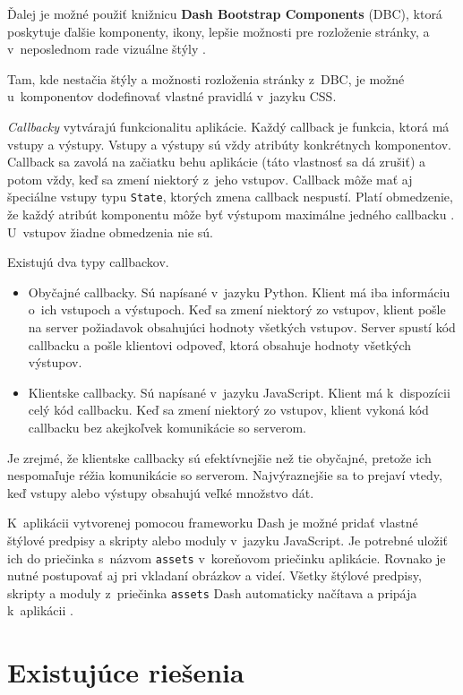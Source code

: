 Ďalej je možné použiť knižnicu \textbf{Dash Bootstrap Components} (DBC), ktorá poskytuje ďalšie komponenty, ikony, lepšie možnosti pre rozloženie stránky, a v~neposlednom rade vizuálne štýly \cite{dbc_documentation}.

Tam, kde nestačia štýly a možnosti rozloženia stránky z~DBC, je možné u~komponentov dodefinovať vlastné pravidlá v~jazyku CSS.

\emph{Callbacky} vytvárajú funkcionalitu aplikácie. Každý callback je funkcia, ktorá má vstupy a výstupy. Vstupy a výstupy sú vždy atribúty konkrétnych komponentov. Callback sa zavolá na začiatku behu aplikácie (táto vlastnosť sa dá zrušiť) a potom vždy, keď sa zmení niektorý z~jeho vstupov. Callback môže mať aj špeciálne vstupy typu \texttt{State}, ktorých zmena callback nespustí. Platí obmedzenie, že každý atribút komponentu môže byť výstupom maximálne jedného callbacku \cite{dash_documentation}. U~vstupov žiadne obmedzenia nie sú.

Existujú dva typy callbackov.
\begin{itemize}
    \item Obyčajné callbacky. Sú napísané v~jazyku Python. Klient má iba informáciu o~ich vstupoch a výstupoch. Keď sa zmení niektorý zo vstupov, klient pošle na server požiadavok obsahujúci hodnoty všetkých vstupov. Server spustí kód callbacku a pošle klientovi odpoveď, ktorá obsahuje hodnoty všetkých výstupov.
    \item Klientske callbacky. Sú napísané v~jazyku JavaScript. Klient má k~dispozícii celý kód callbacku. Keď sa zmení niektorý zo vstupov, klient vykoná kód callbacku bez akejkoľvek komunikácie so serverom.
\end{itemize}

Je zrejmé, že klientske callbacky sú efektívnejšie než tie obyčajné, pretože ich nespomaľuje réžia komunikácie so serverom. Najvýraznejšie sa to prejaví vtedy, keď vstupy alebo výstupy obsahujú veľké množstvo dát.

K~aplikácii vytvorenej pomocou frameworku Dash je možné pridať vlastné štýlové predpisy a skripty alebo moduly v~jazyku JavaScript. Je potrebné uložiť ich do priečinka s~názvom \texttt{assets} v~koreňovom priečinku aplikácie. Rovnako je nutné postupovať aj pri vkladaní obrázkov a videí. Všetky štýlové predpisy, skripty a moduly z~priečinka \texttt{assets} Dash automaticky načítava a pripája k~aplikácii \cite{dash_documentation}.

\section{Existujúce riešenia}
\label{sec:existujuce_riesenia}

